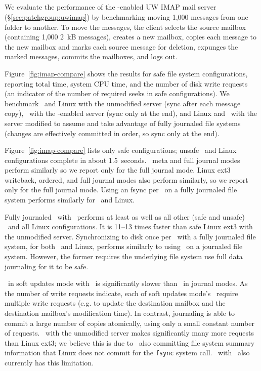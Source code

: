 \subsection {\Patchgroups}
\label{sec:evaluation:uwimap}


We evaluate the performance of the \patchgroup-enabled UW IMAP mail
server (\S\ref{sec:patchgroup:uwimap}) by benchmarking moving 1,000
messages from one folder to another.
%
To move the messages, the client selects the source mailbox (containing
1,000 2~kB messages), creates a new mailbox, copies each message to
the new mailbox and marks each source message for deletion, expunges
the marked messages, commits the mailboxes, and logs out.

Figure~\ref{fig:imap-compare} shows the results for safe file system
configurations,
%
reporting total time, system CPU time, and the number of disk write
requests (an indicator of the number of required seeks in safe
configurations).
%
We benchmark
%
\Kudos\ and Linux with the unmodified server (sync after each message
copy),
%
\Kudos\ with the \patchgroup-enabled server (sync only at the end),
%
and Linux and \Kudos\ with the server modified to assume and take
advantage of fully journaled file systems (changes are effectively
committed in order, so sync only at the end).

Figure~\ref{fig:imap-compare} lists only safe configurations; unsafe
\Kudos\ and Linux configurations complete in about 1.5~seconds.
%
\Kudos\ meta and full journal modes perform similarly so we report
only for the full journal mode.
%
Linux ext3 writeback, ordered, and full journal modes also perform similarly,
so we report only for the full journal mode.
%
Using an fsync per \imapCheck\ on a fully journaled file system performs
similarly for \Kudos\ and Linux.

Fully journaled \Kudos\ with \patchgroups\ performs at least as well
as all other (safe and unsafe) \Kudos\ and all Linux configurations.
It is 11--13 times faster than safe Linux ext3 with the unmodified
server.
%
Synchronizing to disk once per \imapCheck\ with a fully journaled file
system, for both \Kudos\ and Linux, performs similarly to using
\patchgroups\ on a journaled file system. However, the former requires
the underlying file system use full data journaling for it to be safe.

\Kudos\ in soft updates mode with \patchgroups\ is significantly
slower than \Kudos\ in journal modes. As the number of write requests
indicate, each of soft updates mode's \patchgroups\ require multiple
write requests (e.g. to update the destination mailbox and the
destination mailbox's modification time). In contrast, journaling is
able to commit a large number of copies atomically, using only a small
constant number of requests.
%
\Kudos\ with the unmodified server makes significantly many more
requests than Linux ext3; we believe this is due to \Kudos\ also
committing file system summary information that Linux does not commit
for the \texttt{fsync} system call. \Kudos\ with \patchgroups\
also currently has this limitation.

